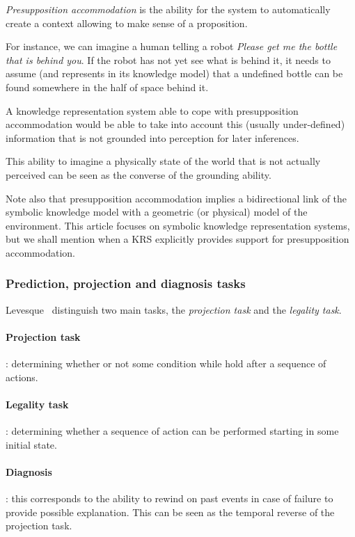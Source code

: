 \documentclass[a4paper, twocolumn]{article}
\begin{document}
\emph{Presupposition accommodation} is the ability for the system to
automatically create a context allowing to make sense of a proposition.

For instance, we can imagine a human telling a robot \emph{Please get me the
bottle that is behind you}. If the robot has not yet see what is behind it, it
needs to assume (and represents in its knowledge model) that a undefined bottle
can be found somewhere in the half of space behind it.

A knowledge representation system able to cope with presupposition
accommodation would be able to take into account this (usually under-defined)
information that is not grounded into perception for later inferences.

This ability to imagine a physically state of the world that is not actually
perceived can be seen as the converse of the grounding ability.

Note also that presupposition accommodation implies a bidirectional link of the
symbolic knowledge model with a geometric (or physical) model of the
environment. This article focuses on symbolic knowledge representation systems,
but we shall mention when a KRS explicitly provides support for presupposition
accommodation.

\subsubsection{Prediction, projection and diagnosis tasks}
\label{sect|prediction-projection}

Levesque~\cite{Levesque2008} distinguish two main tasks, the \emph{projection
task} and the \emph{legality task}.

\paragraph{Projection task}: determining whether or not some condition while
hold after a sequence of actions.

\paragraph{Legality task}: determining whether a sequence of action can be
performed starting in some initial state.

\paragraph{Diagnosis}: this corresponds to the ability to rewind on past events
in case of failure to provide possible explanation. This can be seen as the
temporal reverse of the projection task.
\end{document}
